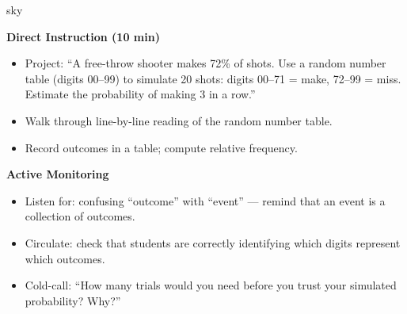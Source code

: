 \documentclass[10pt]{article}
\begin{document}
\begin{skillbox}{sky}
\begin{minipage}[t]{0.48\linewidth}
    \textbf{Direct Instruction (10 min)}
    \begin{itemize}
        \item Project: ``A free-throw shooter makes 72\% of shots. Use a random number
              table (digits 00--99) to simulate 20 shots: digits 00--71 = make, 72--99 =
              miss. Estimate the probability of making 3 in a row.''
        \item Walk through line-by-line reading of the random number table.
        \item Record outcomes in a table; compute relative frequency.
    \end{itemize}
\end{minipage}
\hfill
\begin{minipage}[t]{0.48\linewidth}
    \textbf{Active Monitoring}
    \begin{itemize}
        \item Listen for: confusing ``outcome'' with ``event'' --- remind that an event is
              a collection of outcomes.
        \item Circulate: check that students are correctly identifying which digits
              represent which outcomes.
        \item Cold-call: ``How many trials would you need before you trust your simulated
              probability? Why?''
    \end{itemize}
\end{minipage}
\end{skillbox}
\end{document}
